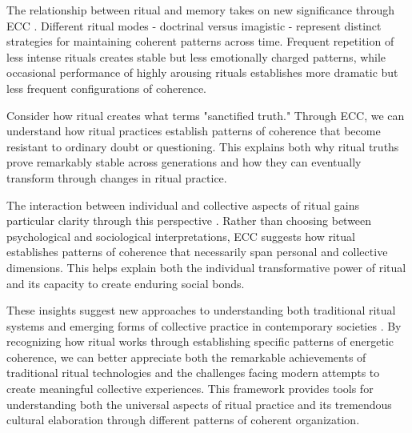 The relationship between ritual and memory takes on new significance through ECC \cite{whitehouse2004modes}. Different ritual modes - doctrinal versus imagistic - represent distinct strategies for maintaining coherent patterns across time. Frequent repetition of less intense rituals creates stable but less emotionally charged patterns, while occasional performance of highly arousing rituals establishes more dramatic but less frequent configurations of coherence.

Consider how ritual creates what \cite{rappaport1999ritual} terms "sanctified truth." Through ECC, we can understand how ritual practices establish patterns of coherence that become resistant to ordinary doubt or questioning. This explains both why ritual truths prove remarkably stable across generations and how they can eventually transform through changes in ritual practice.

The interaction between individual and collective aspects of ritual gains particular clarity through this perspective \cite{collins2004interaction}. Rather than choosing between psychological and sociological interpretations, ECC suggests how ritual establishes patterns of coherence that necessarily span personal and collective dimensions. This helps explain both the individual transformative power of ritual and its capacity to create enduring social bonds.

These insights suggest new approaches to understanding both traditional ritual systems and emerging forms of collective practice in contemporary societies \cite{bloch1989ritual}. By recognizing how ritual works through establishing specific patterns of energetic coherence, we can better appreciate both the remarkable achievements of traditional ritual technologies and the challenges facing modern attempts to create meaningful collective experiences. This framework provides tools for understanding both the universal aspects of ritual practice and its tremendous cultural elaboration through different patterns of coherent organization.